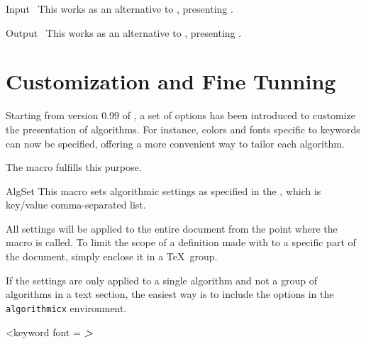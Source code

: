 \documentclass[a4paper, 11pt]{article}
\begin{document}
\begin{Macrodef}{Input}{~}{}
    This works as an alternative to , presenting .
\end{Macrodef}
\begin{Macrodef}{Output}{~}{}
    This works as an alternative to , presenting .
\end{Macrodef}


\section{Customization and Fine Tunning}\label{sec:customization-and-fine-tunning}
Starting from version 0.99 of , a set of options has been introduced to customize the presentation of algorithms. For instance, colors and fonts specific to keywords can now be specified, offering a more convenient way to tailor each algorithm.

The  macro fulfills this purpose.

\begin{Macrodef}{AlgSet}{}{}
    This macro sets algorithmic settings as specified in the , which is key/value comma-separated list.

    All settings will be applied to the entire document from the point where the macro is called. To limit the scope of a definition made with  to a specific part of the document, simply enclose it in a \TeX\ group.
\end{Macrodef}

\begingroup
\begin{PDExample}
    \begin{algorithmic}
        \EndIf
    \end{algorithmic}
\end{PDExample}
\endgroup%

If the settings are only applied to a single algorithm and not a group of algorithms in a text section, the easiest way is to include the options in the \texttt{algorithmicx} environment.

\begin{PDExample}
    \begin{algorithmic}<keyword font = \sffamily\bfseries\itshape>
        \EndIf
    \end{algorithmic}
\end{PDExample}
\end{document}
